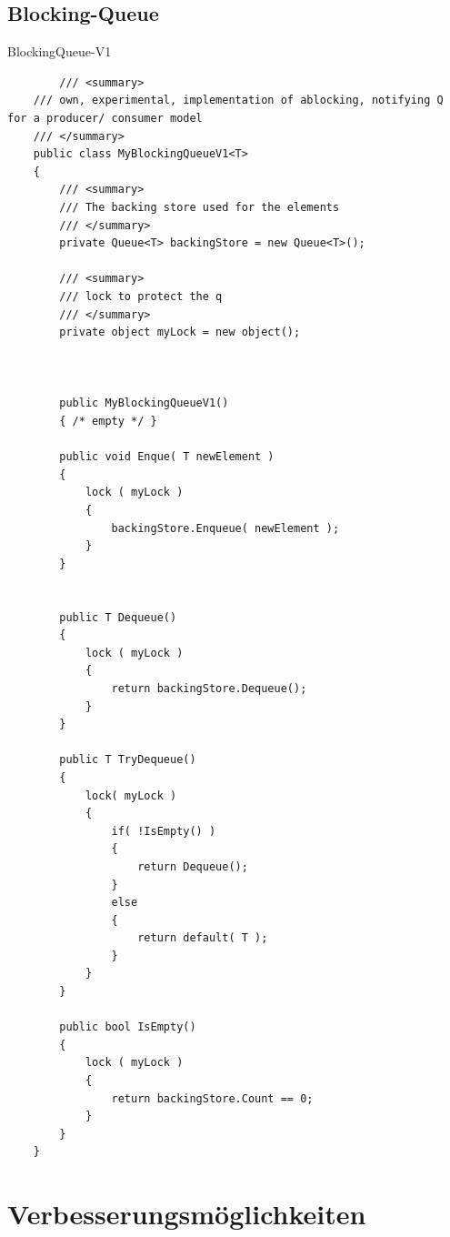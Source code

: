 \subsection{Blocking-Queue}
\lstlistingname{ BlockingQueue-V1}
\begin{lstlisting}
	    /// <summary>
	/// own, experimental, implementation of ablocking, notifying Q for a producer/ consumer model
	/// </summary>
	public class MyBlockingQueueV1<T>
	{
		/// <summary>
		/// The backing store used for the elements
		/// </summary>
		private Queue<T> backingStore = new Queue<T>();
		
		/// <summary>
		/// lock to protect the q
		/// </summary>
		private object myLock = new object();
		
		
		
		public MyBlockingQueueV1()
		{ /* empty */ }
		
		public void Enque( T newElement )
		{
			lock ( myLock )
			{
				backingStore.Enqueue( newElement );
			}
		}
		
		
		public T Dequeue()
		{
			lock ( myLock )
			{
				return backingStore.Dequeue();
			}
		}
		
		public T TryDequeue()
		{
			lock( myLock )
			{
				if( !IsEmpty() )
				{
					return Dequeue();
				}
				else
				{
					return default( T );
				}
			}
		}
		
		public bool IsEmpty()
		{
			lock ( myLock )
			{
				return backingStore.Count == 0;
			}
		}
	}
\end{lstlisting}
\section{Verbesserungsmöglichkeiten}
\chapterend
